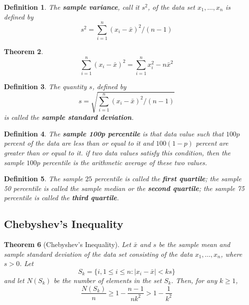 \documentclass[12pt]{article}
\newtheorem{theorem}{Theorem}
\newtheorem{definition}[theorem]{Definition}
\begin{document}
\begin{definition}
  The \textbf{sample variance}, call it $s^2$, of the data set $x_1, \dots, x_n$ is defined by
  \begin{equation*}
    s^2 = \sum_{i=1}^n (x_i - \bar{x})^2/(n-1)
  \end{equation*}
\end{definition}

\begin{theorem}
  \begin{equation*}
    \sum_{i=1}^n (x_i - \bar{x})^2 = \sum_{i=1}^n x_i^2 - n \bar{x}^2
  \end{equation*}
\end{theorem}

\begin{definition}
  The quantity $s$, defined by
  \begin{equation*}
    s = \sqrt{\sum_{i=1}^n (x_i - \bar{x})^2 / (n-1)}
  \end{equation*}
  is called the \textbf{sample standard deviation}.
\end{definition}

\begin{definition}
  The \textbf{sample 100p percentile} is that data value such that $100p$ percent of the data are less than or equal to it and $100(1-p)$ percent are greater than or equal to it. if two data values satisfy this condition, then the sample $100p$ percentile is the arithmetic average of these two values.
\end{definition}

\begin{definition}
  The sample $25$ percentile is called the \textbf{first quartile}; the sample 50 percentile is called the sample median or the \textbf{second quartile}; the sample 75 percentile is called the \textbf{third quartile}.
\end{definition}

\subsection{Chebyshev's Inequality}

\begin{theorem}[Chebyshev's Inequality]
  Let $\bar{x}$ and $s$ be the sample mean and sample standard deviation of the data set consisting of the data $x_1, \dots, x_n$, where $s > 0$. Let
  \begin{equation*}
    S_k = \{ i, 1 \le i \le n: |x_i - \bar{x}| < ks \}
  \end{equation*}
  and let $N(S_k)$ be the number of elements in the set $S_k$. Then, for any $k \ge 1$,
  \begin{equation*}
    \frac {N(S_k)}{n} \ge 1 - \frac{n-1}{nk^2} > 1 - \frac {1}{k^2}
  \end{equation*}
\end{theorem}
\end{document}
